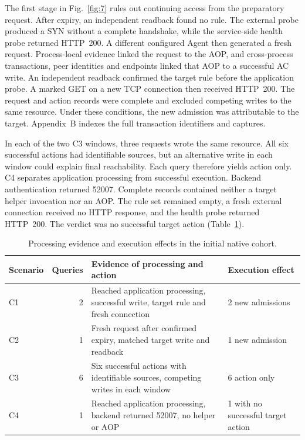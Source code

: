 The first stage in Fig.~\ref{fig:7} rules out continuing access from the preparatory request. After expiry, an independent readback found no rule. The external probe produced a SYN without a complete handshake, while the service-side health probe returned HTTP~200. A different configured Agent then generated a fresh request. Process-local evidence linked the request to the AOP, and cross-process transactions, peer identities and endpoints linked that AOP to a successful AC write. An independent readback confirmed the target rule before the application probe. A marked GET on a new TCP connection then received HTTP~200. The request and action records were complete and excluded competing writes to the same resource. Under these conditions, the new admission was attributable to the target. Appendix~B indexes the full transaction identifiers and captures.

In each of the two C3 windows, three requests wrote the same resource. All six successful actions had identifiable sources, but an alternative write in each window could explain final reachability. Each query therefore yields action only. C4 separates application processing from successful execution. Backend authentication returned 52007. Complete records contained neither a target helper invocation nor an AOP. The rule set remained empty, a fresh external connection received no HTTP response, and the health probe returned HTTP~200. The verdict was no successful target action (Table~\ref{tab:5}).

\begin{table}[t]
\centering
\caption{Processing evidence and execution effects in the initial native cohort.}
\label{tab:5}
\small
\begin{tabularx}{\textwidth}{@{}l r X p{}@{}}
\toprule
Scenario & Queries & Evidence of processing and action & Execution effect \\
\midrule
C1 & 2 & Reached application processing, successful write, target rule and fresh connection & 2 new admissions \\
C2 & 1 & Fresh request after confirmed expiry, matched target write and readback & 1 new admission \\
C3 & 6 & Six successful actions with identifiable sources, competing writes in each window & 6 action only \\
C4 & 1 & Reached application processing, backend returned 52007, no helper or AOP & 1 with no successful target action \\
\bottomrule
\end{tabularx}
\end{table}

